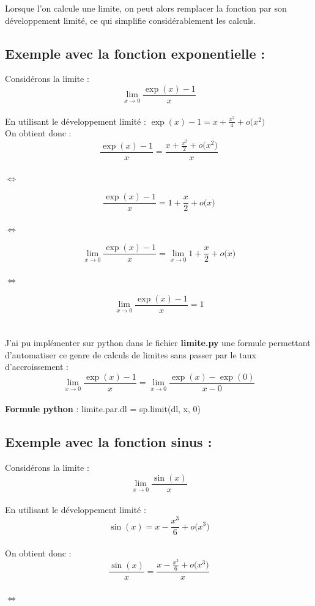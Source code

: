 \documentclass{article}
\begin{document}
Lorsque l’on calcule une limite, on peut alors remplacer la fonction par son développement limité, ce qui simplifie considérablement les calculs. \\

\subsection{Exemple avec la fonction exponentielle :} 
Considérons la limite : $$\boxed{\lim_{x \to 0} \frac{\exp(x) - 1}{x}}$$ \\
En utilisant le développement limité : $\exp(x)-1=x+\frac{x^2}{4}+o\big(x^2\big)$ \\
On obtient donc : $$\boxed{\frac{\exp(x)-1}{x}=\frac{x+\frac{x^2}{2}+o\big(x^2\big)}{x}}$$ \\

$\Leftrightarrow$

$$\boxed{\frac{\exp(x)-1}{x}=1+\frac{x}{2}+o\big(x\big)}$$ \\

$\Leftrightarrow$

$$\boxed{\lim_{x \to 0} \frac{\exp(x) - 1}{x}} = \lim_{x \to 0} 1+\frac{x}{2}+o\big(x\big)$$ \\

$\Leftrightarrow$ 

$$\boxed{\lim_{x \to 0}\frac{\exp(x)-1}{x}=1}$$ \\ \\
J'ai pu implémenter sur python dans le fichier \textbf{limite.py} une formule permettant d'automatiser ce genre de calculs de limites sans passer par le taux d'accroissement : $$\boxed{\lim_{x \to 0}\frac{\exp(x)-1}{x}=\lim_{x \to 0}\frac{\exp(x)-\exp(0)}{x-0}}$$ \\
\textbf{Formule python} : limite.par.dl = sp.limit(dl, x, 0)



\subsection{Exemple avec la fonction sinus :}
Considérons la limite : $$\boxed{\lim_{x \to 0} \frac{\sin(x)}{x}}$$ \\
En utilisant le développement limité : $$\sin(x)=x-\frac{x^3}{6}+o\big(x^3\big)$$ \\
On obtient donc : $$\boxed{\frac{\sin(x)}{x}=\frac{x-\frac{x^3}{6}+o\big(x^3\big)}{x}}$$\\

$\Leftrightarrow$
\end{document}
